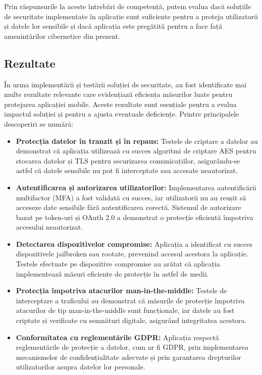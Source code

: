 \documentclass[runningheads]{llncs}
\begin{document}
Prin răspunsurile la aceste întrebări de competență, putem evalua dacă soluțiile de securitate implementate în aplicație sunt suficiente pentru a proteja utilizatorii și datele lor sensibile și dacă aplicația este pregătită pentru a face față amenințărilor cibernetice din prezent.

\subsection{Rezultate}
În urma implementării și testării soluției de securitate, au fost identificate mai multe rezultate relevante care evidențiază eficiența măsurilor luate pentru protejarea aplicației mobile. Aceste rezultate sunt esențiale pentru a evalua impactul soluției și pentru a ajusta eventuale deficiențe. Printre principalele descoperiri se numără:

\begin{itemize}
  \item \textbf{Protecția datelor în tranzit și în repaus:}  
  Testele de criptare a datelor au demonstrat că aplicația utilizează cu succes algoritmi de criptare AES pentru stocarea datelor și TLS pentru securizarea comunicațiilor, asigurându-se astfel că datele sensibile nu pot fi interceptate sau accesate neautorizat.
  
  \item \textbf{Autentificarea și autorizarea utilizatorilor:}  
  Implementarea autentificării multifactor (MFA) a fost validată cu succes, iar utilizatorii nu au reușit să acceseze date sensibile fără autentificarea corectă. Sistemul de autorizare bazat pe token-uri și OAuth 2.0 a demonstrat o protecție eficientă împotriva accesului neautorizat.
  
  \item \textbf{Detectarea dispozitivelor compromise:}  
  Aplicația a identificat cu succes dispozitivele jailbroken sau rootate, prevenind accesul acestora la aplicație. Testele efectuate pe dispozitive compromise au arătat că aplicația implementează măsuri eficiente de protecție în astfel de medii.
  
  \item \textbf{Protecția împotriva atacurilor man-in-the-middle:}  
  Testele de interceptare a traficului au demonstrat că măsurile de protecție împotriva atacurilor de tip man-in-the-middle sunt funcționale, iar datele au fost criptate și verificate cu semnături digitale, asigurând integritatea acestora.
  
  \item \textbf{Conformitatea cu reglementările GDPR:}  
  Aplicația respectă reglementările de protecție a datelor, cum ar fi GDPR, prin implementarea mecanismelor de confidențialitate adecvate și prin garantarea drepturilor utilizatorilor asupra datelor lor personale.
\end{itemize}
\end{document}
